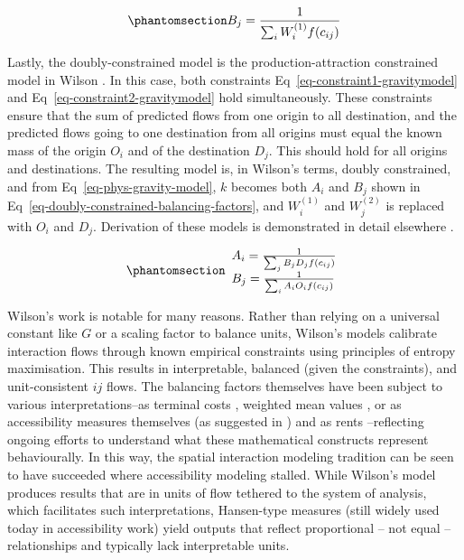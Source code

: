 \documentclass[
  10pt,
  letterpaper,
]{article}
\begin{document}
\begin{equation}\phantomsection\label{eq-attraction-constrained-balancing-factor}{
B_j = \frac{1}{\sum_i W_i^{(1)} f(c_{ij})}
}\end{equation}

Lastly, the doubly-constrained model is the production-attraction
constrained model in Wilson \citep{wilson1971}. In this case, both
constraints Eq~\ref{eq-constraint1-gravitymodel} and
Eq~\ref{eq-constraint2-gravitymodel} hold simultaneously. These
constraints ensure that the sum of predicted flows from one origin to
all destination, and the predicted flows going to one destination from
all origins must equal the known mass of the origin \(O_i\) and of the
destination \(D_j\). This should hold for all origins and destinations.
The resulting model is, in Wilson's terms, doubly constrained, and from
Eq~\ref{eq-phys-gravity-model}, \(k\) becomes both \(A_i\) and \(B_j\)
shown in Eq~\ref{eq-doubly-constrained-balancing-factors}, and
\(W_i^{(1)}\) and \(W_j^{(2)}\) is replaced with \(O_i\) and \(D_j\).
Derivation of these models is demonstrated in detail elsewhere
\citep[e.g.,][]{ortuzar_2011_modelling, wilsonSTATISTICALTHEORYSPATIAL1967}.

\begin{equation}\phantomsection\label{eq-doubly-constrained-balancing-factors}{
\begin{array}{l}
A_i = \frac{1}{\sum_j B_j D_j f(c_{ij})}\\
B_j = \frac{1}{\sum_i A_i O_i f(c_{ij})}
\end{array}
}\end{equation}

Wilson's work is notable for many reasons. Rather than relying on a
universal constant like \(G\) or a scaling factor to balance units,
Wilson's models calibrate interaction flows through known empirical
constraints using principles of entropy maximisation. This results in
interpretable, balanced (given the constraints), and unit-consistent
\(ij\) flows. The balancing factors themselves have been subject to
various interpretations--as terminal costs
\citep{dieter1962distribution}, weighted mean values
\citep{kirbyNormalizingFactorsGravity1970}, or as accessibility measures
themselves \citep{cesario1977new} (as suggested in \citet{Wilson1971})
and as rents \citep{morphetGravityModelCalibration2023}--reflecting
ongoing efforts to understand what these mathematical constructs
represent behaviourally. In this way, the spatial interaction modeling
tradition can be seen to have succeeded where accessibility modeling
stalled. While Wilson's model produces results that are in units of flow
tethered to the system of analysis, which facilitates such
interpretations, Hansen-type measures (still widely used today in
accessibility work) yield outputs that reflect proportional -- not equal
-- relationships and typically lack interpretable units.
\end{document}
